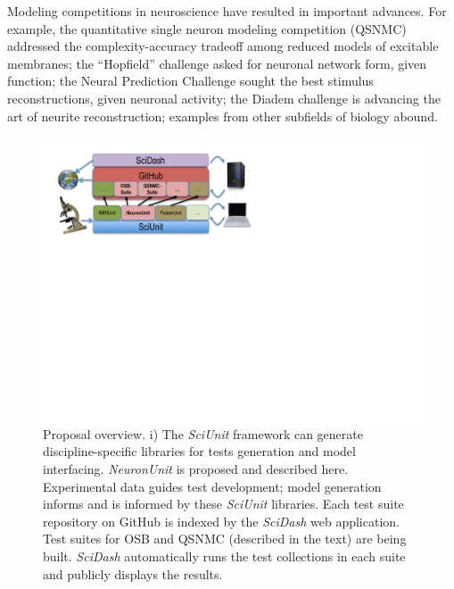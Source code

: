 \documentclass[11pt,letterpaper]{article}
\begin{document}
Modeling competitions in neuroscience have resulted in important advances. 
For example, the quantitative single neuron modeling competition (QSNMC)\cite{jolivet_quantitative_2008} addressed the complexity-accuracy tradeoff among reduced models of excitable membranes; 
the ``Hopfield'' challenge\cite{hopfield_what_2000} asked for neuronal network form, given function; 
the Neural Prediction Challenge sought the best stimulus reconstructions, given neuronal activity\cite{neural_prediction_url}; the Diadem challenge is advancing the art of neurite reconstruction\cite{diadem_url}; 
examples from other subfields of biology abound\cite{dream_url}. 

\begin{figure}
\vspace{-38px}
\includegraphics[scale=0.75]{sciunit_overview.pdf}
\caption{Proposal overview. 
\small{i) The \textit{SciUnit} framework can generate discipline-specific libraries for tests generation and model interfacing.  
\textit{NeuronUnit} is proposed and described here.  Experimental data guides test development; model generation informs and is informed by these \textit{SciUnit} libraries.  
Each  test suite repository on GitHub is indexed by the \textit{SciDash} web application.  
Test suites for OSB and QSNMC (described in the text) are being built. 
\textit{SciDash} automatically runs the test collections in each suite and publicly displays the results.}}
\vspace{-10px}
\label{fig:sciunit_overview}
\end{figure}
\leavevmode
\vspace{-0px}
\end{document}
